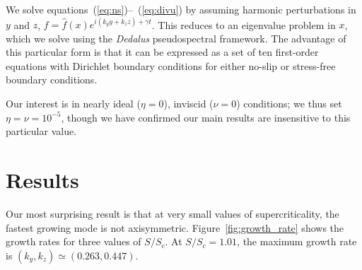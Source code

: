 \documentclass[aps,prl,reprint,groupedaddress]{revtex4-1}
\newcommand{\SSC}{S/S_{c}}
\begin{document}
We solve equations~(\ref{eq:ns})--~(\ref{eq:divu}) by assuming harmonic perturbations in $y$ and $z$, $f = \hat{f}(x) e^{i(k_y y + k_z z) + \gamma t}$. This reduces to an eigenvalue problem in $x$, which we solve using the \emph{Dedalus} pseudospectral framework. The advantage of this particular form is that it can be expressed as a set of ten first-order equations with Dirichlet boundary conditions for either no-slip or stress-free boundary conditions. 

Our interest is in nearly ideal ($\eta = 0$), inviscid ($\nu = 0$) conditions; we thus set $\eta=\nu=10^{-5}$, though we have confirmed our main results are insensitive to this particular value. 

\section{Results}
\label{sec:results}
Our most surprising result is that at very small values of supercriticality, the fastest growing mode is not axisymmetric. Figure~\ref{fig:growth_rate} shows the growth rates for three values of $\SSC$. At $\SSC = 1.01$, the maximum growth rate is $(k_y, k_z) \simeq (0.263, 0.447)$. 
\end{document}

